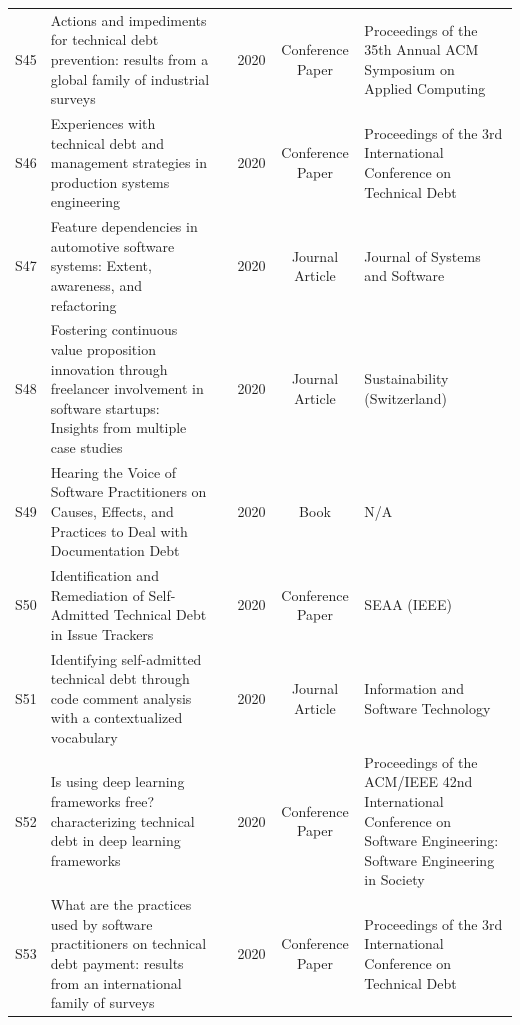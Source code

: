 \documentclass[12pt,reqno, twoside]{amsbook}
\theoremstyle{plain}
\numberwithin{equation}{chapter}
\numberwithin{section}{chapter}
\begin{document}
\begin{landscape}
\begin{center}
\begin{longtable}{|c|p{5cm}|p{4.5cm}|c|c|p{5.5cm}|}
S45 & Actions and impediments for technical debt prevention: results from a global family of industrial surveys & \citeauthor{Freire2020} & 2020 & Conference Paper & Proceedings of the 35th Annual ACM Symposium on Applied Computing \\
S46 & Experiences with technical debt and management strategies in production systems engineering & \citeauthor{Waltersdorfer2020} & 2020 & Conference Paper & Proceedings of the 3rd International Conference on Technical Debt \\
S47 & Feature dependencies in automotive software systems: Extent, awareness, and refactoring & \citeauthor{Vogelsang2020} & 2020 & Journal Article & Journal of Systems and Software \\
S48 & Fostering continuous value proposition innovation through freelancer involvement in software startups: Insights from multiple case studies & \citeauthor{Gupta2020} & 2020 & Journal Article & Sustainability (Switzerland) \\
S49 & Hearing the Voice of Software Practitioners on Causes, Effects, and Practices to Deal with Documentation Debt & \citeauthor{Rios2020} & 2020 & Book & N/A \\
S50 & Identification and Remediation of Self-Admitted Technical Debt in Issue Trackers & \citeauthor{Li2020} & 2020 & Conference Paper & SEAA (IEEE) \\
S51 & Identifying self-admitted technical debt through code comment analysis with a contextualized vocabulary & \citeauthor{Farias2020} & 2020 & Journal Article & Information and Software Technology \\
S52 & Is using deep learning frameworks free? characterizing technical debt in deep learning frameworks & \citeauthor{Liu2020} & 2020 & Conference Paper & Proceedings of the ACM/IEEE 42nd International Conference on Software Engineering: Software Engineering in Society \\
S53 & What are the practices used by software practitioners on technical debt payment: results from an international family of surveys & \citeauthor{Perez2020} & 2020 & Conference Paper & Proceedings of the 3rd International Conference on Technical Debt \\


\end{longtable}
\end{center}
\end{landscape}
\end{document}
